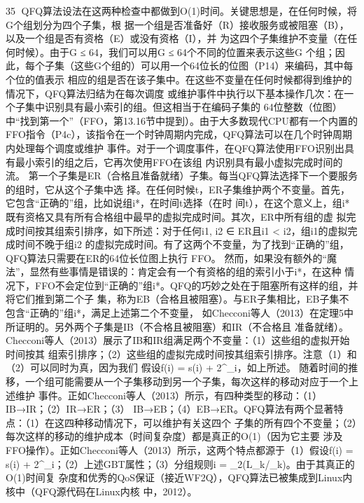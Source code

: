                                                                35
QFQ算法设法在这两种检查中都做到O(1)时间。关键思想是，在任何时候，将G个组划分为四个子集，根
据一个组是否准备好（R）接收服务或被阻塞（B），以及一个组是否有资格（E）或没有资格（I），并
为这四个子集维护不变量（在任何时候）。由于G ≤ 64，我们可以用G ≤ 64个不同的位置来表示这些G
个组；因此，每个子集（这些G个组的）可以用一个64位长的位图（P14）来编码，其中每个位的值表示
相应的组是否在该子集中。在这些不变量在任何时候都得到维护的情况下，QFQ算法归结为在每次调度
或维护事件中执行以下基本操作几次：在一个子集中识别具有最小索引的组。但这相当于在编码子集的
64位整数（位图）中“找到第一个”（FFO，第13.16节中提到）。由于大多数现代CPU都有一个内置的
FFO指令（P4c），该指令在一个时钟周期内完成，QFQ算法可以在几个时钟周期内处理每个调度或维护
事件。对于一个调度事件，在QFQ算法使用FFO识别出具有最小索引的组之后，它再次使用FFO在该组
内识别具有最小虚拟完成时间的流。
第一个子集是ER（合格且准备就绪）子集。每当QFQ算法选择下一个要服务的组时，它从这个子集中选
择。在任何时候t，ER子集维护两个不变量。首先，它包含“正确的”组，比如说组i*，在时间t选择（在时
间t），在这个意义上，组i*既有资格又具有所有合格组中最早的虚拟完成时间。其次，ER中所有组的虚
拟完成时间按其组索引排序，如下所述：对于任何i1, i2 ∈ ER且i1 < i2，组i1的虚拟完成时间不晚于组i2
的虚拟完成时间。有了这两个不变量，为了找到“正确的”组，QFQ算法只需要在ER的64位长位图上执行
FFO。
然而，如果没有额外的“魔法”，显然有些事情是错误的：肯定会有一个有资格的组的索引小于i*，在这种
情况下，FFO不会定位到“正确的”组i*。QFQ的巧妙之处在于阻塞所有这样的组，并将它们推到第二个子
集，称为EB（合格且被阻塞）。与ER子集相比，EB子集不包含“正确的”组i*，满足上述第二个不变量，
如Checconi等人（2013）在定理5中所证明的。另外两个子集是IB（不合格且被阻塞）和IR（不合格且
准备就绪）。Checconi等人（2013）展示了IB和IR组满足两个不变量：（1）这些组的虚拟开始时间按其
组索引排序；（2）这些组的虚拟完成时间按其组索引排序。注意（1）和（2）可以同时为真，因为我们
假设f(i) = s(i) + 2^{\sigma_i}，如上所述。
随着时间的推移，一个组可能需要从一个子集移动到另一个子集，每次这样的移动对应于一个上述维护
事件。正如Checconi等人（2013）所示，有四种类型的移动：（1）IB→IR；（2）IR→ER；（3）
IB→EB；（4）EB→ER。QFQ算法有两个显著特点：（1）在这四种移动情况下，可以维护有关这四个
子集的所有四个不变量；（2）每次这样的移动的维护成本（时间复杂度）都是真正的O(1)（因为它主要
涉及FFO操作）。正如Checconi等人（2013）所示，这两个特点都源于（1）假设f(i) = s(i) +
2^{\sigma_i}；（2）上述GBT属性；（3）分组规则i = \log_2(L_k/\phi_k)。由于其真正的O(1)时间复
杂度和优秀的QoS保证（接近WF2Q），QFQ算法已被集成到Linux内核中（QFQ源代码在Linux内核
中，2012）。

